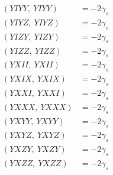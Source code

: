 \documentclass{article}
\begin{document}
\begin{align*}
  (YIYY,\ YIYY) &= - 2 \gamma_{s} \\
  (YIYZ,\ YIYZ) &= - 2 \gamma_{s} \\
  (YIZY,\ YIZY) &= - 2 \gamma_{s} \\
  (YIZZ,\ YIZZ) &= - 2 \gamma_{s} \\
  (YXII,\ YXII) &= - 2 \gamma_{s} \\
  (YXIX,\ YXIX) &= - 2 \gamma_{s} \\
  (YXXI,\ YXXI) &= - 2 \gamma_{s} \\
  (YXXX,\ YXXX) &= - 2 \gamma_{s} \\
  (YXYY,\ YXYY) &= - 2 \gamma_{s} \\
  (YXYZ,\ YXYZ) &= - 2 \gamma_{s} \\
  (YXZY,\ YXZY) &= - 2 \gamma_{s} \\
  (YXZZ,\ YXZZ) &= - 2 \gamma_{s}
\end{align*}
\end{document}
